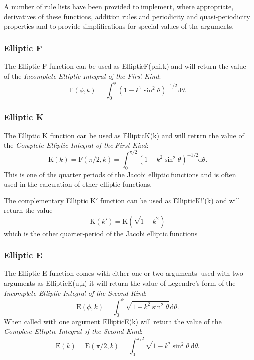 A number of rule lists have been provided to implement, where appropriate,
derivatives of these functions, addition rules and periodicity and
quasi-periodicity properties and to provide simplifications for special values
of the arguments.

\subsubsection{Elliptic F}
\hypertarget{operator:EllipticF}{}

The Elliptic F function can be used as \f{EllipticF(phi,k)} and 
will return the value of the \emph{Incomplete Elliptic Integral of the 
First Kind}:
$$\mathrm{F}(\phi, k)=\int_0^\phi(1-k^2 \sin^2 \theta)^{-1/2} \mathrm{d}\theta.$$

\subsubsection{Elliptic K}
\hypertarget{operator:EllipticK}{}

The Elliptic K function can be used as \f{EllipticK(k)} and will 
return the value of the \emph{Complete Elliptic Integral of the
First Kind}:
$$\mathrm{K}(k)=\mathrm{F}(\pi/2, k) =\int_0^{\pi/2}(1-k^2 \sin^2 \theta)^{-1/2}\mathrm{d}\theta.$$
This is one of the quarter periods of the Jacobi elliptic
functions and is often used in the calculation of other elliptic functions.

The complementary Elliptic K$'$ function can be used as \f{EllipticK!$'$(k)}
and will return the value
$$\mathrm{K}(k')=\mathrm{K}(\sqrt{1-k^2})$$
which is the other quarter-period of the Jacobi elliptic functions.

\subsubsection{Elliptic E}
\hypertarget{operator:EllipticE}{}

The Elliptic E function comes with either one or two arguments;
used with two arguments as \f{EllipticE(u,k)}
it will return the value of Legendre's form of
the \emph{Incomplete Elliptic Integral of the Second Kind}:
$$\mathrm{E}(\phi, k)=\int_0^\phi \sqrt{1-k^2 \sin^2 \theta} \,\mathrm{d}\theta.$$
 When called with one argument \f{EllipticE(k)} will return the value of the
\emph{Complete Elliptic Integral of the Second Kind}:
$$\mathrm{E}(k)=\mathrm{E}(\pi/2, k) =
\int_0^{\pi/2} \sqrt{1-k^2 \sin^2 \theta} \,\mathrm{d}\theta.$$

